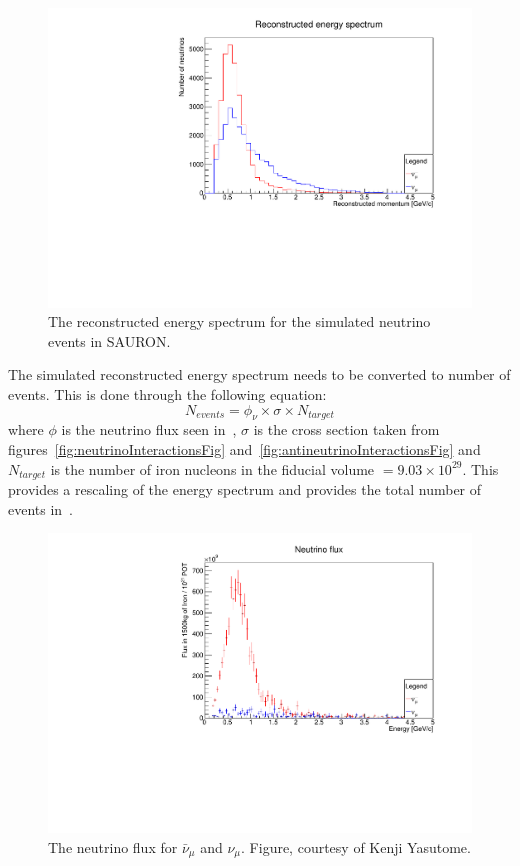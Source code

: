 \begin{figure}[h!]
\centering
\includegraphics[width=.9\textwidth]{figures/NeutrinoChap/ReconstructedESpectrum.pdf}
\caption{The reconstructed energy spectrum for the simulated neutrino events in SAURON.}
\label{fig:SimuSpectrum}
\end{figure}

The simulated reconstructed energy spectrum needs to be converted to number of events. This is done through the following equation:
\begin{equation}
N_{events} = \phi_\nu \times \sigma \times N_{target}
\end{equation}
where $\phi$ is the neutrino flux seen in~, $\sigma$ is the cross section taken from figures~\ref{fig:neutrinoInteractionsFig} and~\ref{fig:antineutrinoInteractionsFig} and $N_{target}$ is the number of iron nucleons in the fiducial volume $=9.03 \times 10^{29}$. This provides a rescaling of the energy spectrum and provides the total number of events in~.

\begin{figure}[h!]
\centering
\includegraphics[width=.9\textwidth]{figures/NeutrinoChap/FluxSpectrum.pdf}
\caption{The neutrino flux for $\bar{\nu}_\mu$ and $\nu_\mu$. Figure, courtesy of Kenji Yasutome.}
\label{fig:SimuFlux}
\end{figure}

